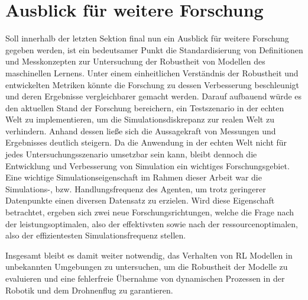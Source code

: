\section{Ausblick für weitere Forschung}

Soll innerhalb der letzten Sektion final nun ein Ausblick für weitere Forschung gegeben werden, ist ein bedeutsamer Punkt die Standardisierung von Definitionen und Messkonzepten zur Untersuchung der Robustheit von Modellen des maschinellen Lernens.
Unter einem einheitlichen Verständnis der Robustheit und entwickelten Metriken könnte die Forschung zu dessen Verbesserung beschleunigt und deren Ergebnisse vergleichbarer gemacht werden.
Darauf aufbauend würde es den aktuellen Stand der Forschung bereichern, ein Testszenario in der echten Welt zu implementieren, um die Simulationsdiskrepanz zur realen Welt zu verhindern.
Anhand dessen ließe sich die Aussagekraft von Messungen und Ergebnisses deutlich steigern.
Da die Anwendung in der echten Welt nicht für jedes Untersuchungsszenario umsetzbar sein kann, bleibt dennoch die Entwicklung und Verbesserung von Simulation ein wichtiges Forschungsgebiet.
Eine wichtige Simulationseigenschaft im Rahmen dieser Arbeit war die Simulations-, bzw. Handlungsfrequenz des Agenten, um trotz geringerer Datenpunkte einen diversen Datensatz zu erzielen.
Wird diese Eigenschaft betrachtet, ergeben sich zwei neue Forschungsrichtungen, welche die Frage nach der leistungsoptimalen, also der effektivsten sowie nach der ressourcenoptimalen, also der effizientesten Simulationsfrequenz stellen.

Insgesamt bleibt es damit weiter notwendig, das Verhalten von RL Modellen in unbekannten Umgebungen zu untersuchen, um die Robustheit der Modelle zu evaluieren und eine fehlerfreie Übernahme von dynamischen Prozessen in der Robotik und dem Drohnenflug zu garantieren.